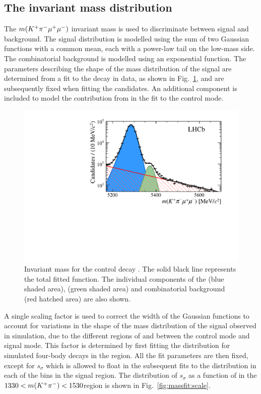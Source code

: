\subsection[The \mkpimm invariant mass distribution]{The \boldmath{\mkpimm} invariant mass distribution}
\label{sec:kpimm:massfit}

The $m({{K}^+}{{\pi}^-}{\mu^+\mu^-})$ invariant mass is used to discriminate between signal and background. The signal distribution is modelled using the sum of two Gaussian functions with a common mean, each with a power-law tail on the low-mass side.  The combinatorial background is modelled using an exponential function.  The parameters describing the shape of the mass distribution of the signal are determined from a fit to the \BdToJPsiKstP decay in data, as shown in Fig.~\ref{fig:massfit:jpsi}, and are subsequently fixed when fitting the \BdToKpimm candidates. An additional component is included to model the contribution from \BsToJPsiKst in the fit to the control mode. 

\begin{figure}[!tb]
\centering
\includegraphics[width=0.7\linewidth]{figs/kpimm/massfit/fit_jpsi_log.pdf}
\caption{Invariant mass \mkpimm for the control decay \BdToJPsiKst. The solid black line represents the total fitted function.  The individual components of the \BdToJPsiKst (blue shaded area), \BsToJPsiKst (green shaded area) and combinatorial background (red hatched area) are also shown.}
\label{fig:massfit:jpsi}
\end{figure}

A single scaling factor is used to correct the width of the Gaussian functions to account for variations in the shape of the mass distribution of the signal observed in simulation, due to the different regions of \mkpi and \qsq between the control mode and signal mode. This factor is determined by first fitting the \mkpimm distribution for simulated four-body \BdToKpimm decays in the \BdToJPsiKstP region.  All the fit parameters are then fixed, except for $s_{\sigma}$ which is allowed to float in the subsequent fits to the \mkpimm distribution in each of the \qsq bins in the \BdToKpimm signal region. The distribution of $s_{\sigma}$ as a function of \qsq in the $1330<m({{K}^+}{{\pi}^-})<1530$\mevcc region is shown in Fig.~\ref{fig:massfit:scale}.

